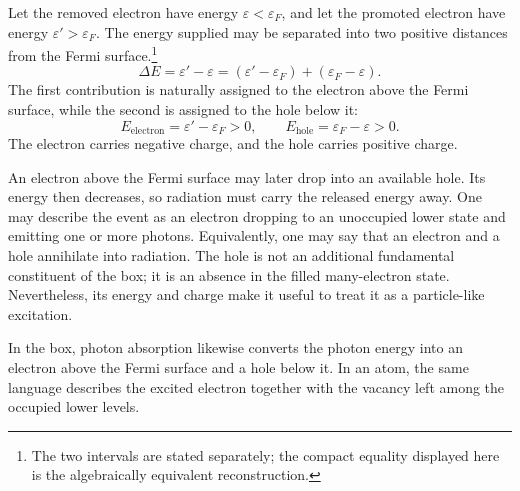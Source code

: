 Let the removed electron have energy \(\varepsilon<\varepsilon_F\), and let the promoted electron have energy \(\varepsilon'>\varepsilon_F\). The energy supplied may be separated into two positive distances from the Fermi surface.\footnote{The two intervals are stated separately; the compact equality displayed here is the algebraically equivalent reconstruction.}
\begin{equation}
\Delta E
=\varepsilon'-\varepsilon
=(\varepsilon'-\varepsilon_F)+(\varepsilon_F-\varepsilon).
\end{equation}
The first contribution is naturally assigned to the electron above the Fermi surface, while the second is assigned to the hole below it:
\begin{equation}
E_{\mathrm{electron}}=\varepsilon'-\varepsilon_F>0,
\qquad
E_{\mathrm{hole}}=\varepsilon_F-\varepsilon>0.
\end{equation}
The electron carries negative charge, and the hole carries positive charge.

An electron above the Fermi surface may later drop into an available hole. Its energy then decreases, so radiation must carry the released energy away. One may describe the event as an electron dropping to an unoccupied lower state and emitting one or more photons. Equivalently, one may say that an electron and a hole annihilate into radiation. The hole is not an additional fundamental constituent of the box; it is an absence in the filled many-electron state. Nevertheless, its energy and charge make it useful to treat it as a particle-like excitation.

\begin{classroomqa}
\end{classroomqa}

In the box, photon absorption likewise converts the photon energy into an electron above the Fermi surface and a hole below it. In an atom, the same language describes the excited electron together with the vacancy left among the occupied lower levels.

